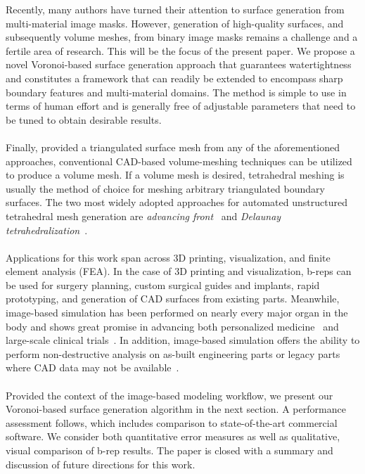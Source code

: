 Recently, many authors have turned their attention to surface generation from multi-material image masks. However, generation of high-quality surfaces, and subsequently volume meshes, from binary image masks remains a challenge and a fertile area of research. This will be the focus of the present paper.  We propose a novel Voronoi-based surface generation approach that guarantees watertightness and constitutes a framework that can readily be extended to encompass sharp boundary features and multi-material domains. The method is simple to use in terms of human effort and is generally free of adjustable parameters that need to be tuned to obtain desirable results. \\ \\
%
Finally, provided a triangulated surface mesh from any of the aforementioned approaches, conventional CAD-based volume-meshing techniques can be utilized to produce a volume mesh. If a volume mesh is desired, tetrahedral meshing is usually the method of choice for meshing arbitrary triangulated boundary surfaces. The two most widely adopted approaches for automated unstructured tetrahedral mesh generation are \textit{advancing front}~\cite{jin_1993, lohner_1988} and \textit{Delaunay tetrahedralization}~\cite{lohner_1997}. \\ \\
%
Applications for this work span across 3D printing, visualization, and finite element analysis (FEA). In the case of 3D printing and visualization, b-reps can be used for surgery planning, custom surgical guides and implants, rapid prototyping, and generation of CAD surfaces from existing parts. Meanwhile, image-based simulation has been performed on nearly every major organ in the body and shows great promise in advancing both personalized medicine~\cite{neal2010current} and large-scale clinical trials~\cite{viceconti2016silico}. In addition, image-based simulation offers the ability to perform non-destructive analysis on as-built engineering parts or legacy parts where CAD data may not be available~\cite{bradley2005advances}.\\ \\
%
Provided the context of the image-based modeling workflow, we present our Voronoi-based surface generation algorithm in the next section. A performance assessment follows, which includes comparison to state-of-the-art commercial software.  We consider both quantitative error measures as well as qualitative, visual comparison of b-rep results.  The paper is closed with a summary and discussion of future directions for this work.